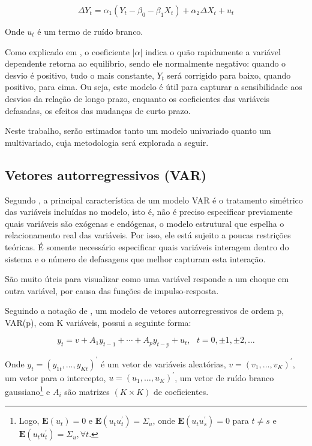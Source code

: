 \documentclass[a4paper,
               article,
               12pt,
               openany,
               oneside,
               english,
               brazil]{abntex2}
\numberwithin{equation}{section}
\begin{document}
    \begin{equation}
        \Delta Y_t = \alpha_1 (Y_t - \beta_0 - \beta_1 X_t) + \alpha_2 \Delta X_t + u_t \label{ecm}
    \end{equation}

    Onde $ u_t $ é um termo de ruído branco. 
    
    Como explicado em \textcite{coint1}, o coeficiente $ \lvert \alpha \rvert $ indica o quão rapidamente a variável dependente retorna ao equilíbrio, sendo ele normalmente negativo: quando o desvio é positivo, tudo o mais constante, $ Y_t $ será corrigido para baixo, quando positivo, para cima. Ou seja, este modelo é útil para capturar a sensibilidade aos desvios da relação de longo prazo, enquanto os coeficientes das variáveis defasadas, os efeitos das mudanças de curto prazo.
    
    Neste trabalho, serão estimados tanto um modelo univariado quanto um multivariado, cuja metodologia será explorada a seguir.

    \subsection{Vetores autorregressivos (VAR)}

    Segundo \textcite[51-52]{gustavo}, a principal característica de um modelo VAR é o tratamento simétrico das variáveis incluídas no modelo, isto é, não é preciso especificar previamente quais variáveis são exógenas e endógenas, o modelo estrutural que espelha o relacionamento real das variáveis. Por isso, ele está sujeito a poucas restrições teóricas. É somente necessário especificar quais variáveis interagem dentro do sistema e o número de defasagens que melhor capturam esta interação.
    
    São muito úteis para visualizar como uma variável responde a um choque em outra variável, por causa das funções de impulso-resposta. 

    Seguindo a notação de \textcite[p.~13]{lutkepool}, um modelo de vetores autorregressivos de ordem p, VAR(p), com K variáveis, possui a seguinte forma:

    \begin{equation}
        \label{VAR}
        y_t = v + A_1 y_{t-1} + \cdots + A_p y_{t-p} + u_t,\text{\ \ } t = 0, \pm 1, \pm 2, \ldots
    \end{equation}

    Onde $ y_t = (y_{1t}, \ldots, y_{Kt})^{'} $ é um vetor de variáveis aleatórias, $ v  = (v_{1}, \ldots, v_{K})^{'}  $, um vetor para o intercepto, $ u = (u_{1}, \ldots, u_{K})^{'} $, um vetor de ruído branco gaussiano\footnote{Logo, $ \mathbf{E}(u_t) = 0 $ e $ \mathbf{E}(u_t u^{'}_t) = \Sigma_{u} $, onde $ \mathbf{E}(u_tu^{'}_s) = 0 $ para $ t \neq s $ e $ \mathbf{E}(u_t u^{'}_t) = \Sigma_u, \forall t $.} e $ A_i $ são matrizes $ (K \times K) $ de coeficientes.
\end{document}
